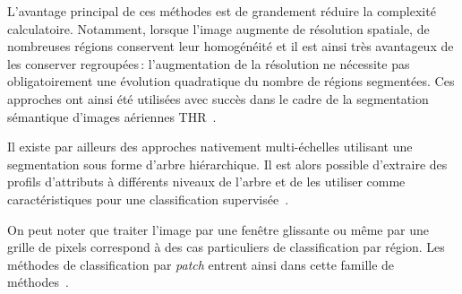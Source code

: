 L'avantage principal de ces méthodes est de grandement réduire la complexité calculatoire. Notamment, lorsque l'image augmente de résolution spatiale, de nombreuses régions conservent leur homogénéité et il est ainsi très avantageux de les conserver regroupées\,: l'augmentation de la résolution ne nécessite pas obligatoirement une évolution quadratique du nombre de régions segmentées. Ces approches ont ainsi été utilisées avec succès dans le cadre de la segmentation sémantique d'images aériennes \gls{THR}~\cite{lagrange_benchmarking_2015,vargas_superpixel-based_2014}.

Il existe par ailleurs des approches nativement multi-échelles utilisant une segmentation sous forme d'arbre hiérarchique. Il est alors possible d'extraire des profils d'attributs à différents niveaux de l'arbre et de les utiliser comme caractéristiques pour une classification supervisée~\cite{cui_combining_2016,pham_feature_2018}.

On peut noter que traiter l'image par une fenêtre glissante ou même par une grille de pixels correspond à des cas particuliers de classification par région. Les méthodes de classification par \emph{patch} entrent ainsi dans cette famille de méthodes~\cite{papadomanolaki_patch-based_2017,vakalopoulou_building_2015}.




